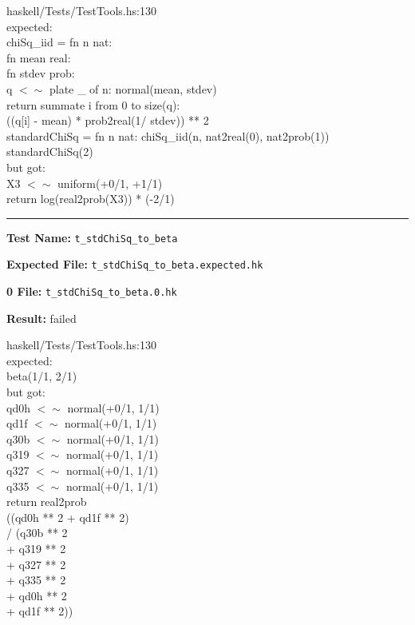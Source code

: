 \documentclass[11pt]{article}
\begin{document}
\bigskip
\noindent
haskell/Tests/TestTools.hs:130\\expected:\\chiSq\_iid = fn n nat:\\            fn mean real:\\            fn stdev prob:\\            q $<\sim$ plate \_ of n: normal(mean, stdev)\\            return summate i from 0 to size(q):\\                   ((q[i] - mean) * prob2real(1/ stdev)) ** 2\\standardChiSq = fn n nat: chiSq\_iid(n, nat2real(0), nat2prob(1))\\standardChiSq(2)\\but got:\\X3 $<\sim$ uniform(+0/1, +1/1)\\return log(real2prob(X3)) * (-2/1)\\

\hrule

\bigskip
\textbf{Test Name:} {\tt t\_stdChiSq\_to\_beta}

\textbf{Expected File:} {\tt t\_stdChiSq\_to\_beta.expected.hk}

\bigskip


\bigskip
\textbf{0 File:} {\tt t\_stdChiSq\_to\_beta.0.hk}

\bigskip


\bigskip
\textbf{Result:} failed

\bigskip
\noindent


\bigskip
\noindent
haskell/Tests/TestTools.hs:130\\expected:\\beta(1/1, 2/1)\\but got:\\qd0h $<\sim$ normal(+0/1, 1/1)\\qd1f $<\sim$ normal(+0/1, 1/1)\\q30b $<\sim$ normal(+0/1, 1/1)\\q319 $<\sim$ normal(+0/1, 1/1)\\q327 $<\sim$ normal(+0/1, 1/1)\\q335 $<\sim$ normal(+0/1, 1/1)\\return real2prob\\         ((qd0h ** 2 + qd1f ** 2)\\          / (q30b ** 2\\             + q319 ** 2\\             + q327 ** 2\\             + q335 ** 2\\             + qd0h ** 2\\             + qd1f ** 2))\\
\end{document}
